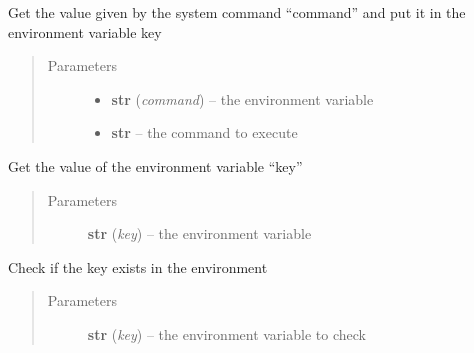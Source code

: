 \documentclass[a4paper,10pt,english]{sphinxmanual}
\begin{document}
\begin{fulllineitems}
\begin{fulllineitems}
\begin{quote}
\begin{description}
\begin{itemize}
\end{itemize}

\end{description}\end{quote}

\end{fulllineitems}


\begin{fulllineitems}
\label{commands/apidoc/src:src.environment.Environ.command_value}
Get the value given by the system command ``command'' 
and put it in the environment variable key
\begin{quote}\begin{description}
\item[{Parameters}] \leavevmode\begin{itemize}
\item {} 
\textbf{str} (\emph{command}) -- the environment variable

\item {} 
\textbf{str} -- the command to execute

\end{itemize}

\end{description}\end{quote}

\end{fulllineitems}


\begin{fulllineitems}
\label{commands/apidoc/src:src.environment.Environ.get}
Get the value of the environment variable ``key''
\begin{quote}\begin{description}
\item[{Parameters}] \leavevmode
\textbf{str} (\emph{key}) -- the environment variable

\end{description}\end{quote}

\end{fulllineitems}


\begin{fulllineitems}
\label{commands/apidoc/src:src.environment.Environ.is_defined}
Check if the key exists in the environment
\begin{quote}\begin{description}
\item[{Parameters}] \leavevmode
\textbf{str} (\emph{key}) -- the environment variable to check


\end{description}
\end{quote}
\end{fulllineitems}
\end{fulllineitems}
\end{document}
